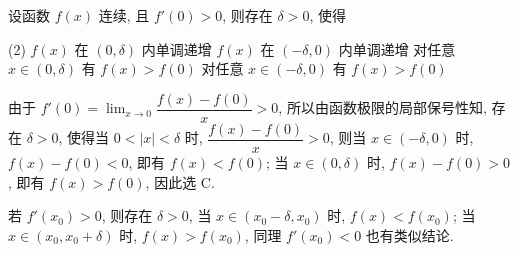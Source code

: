 \begin{example}[2004 数一]
    设函数 $f(x)$ 连续, 且 $f'(0)>0$, 则存在 $\delta>0$, 使得
    \begin{tasks}(2)
        \task $f(x)$ 在 $(0,\delta)$ 内单调递增
        \task $f(x)$ 在 $(-\delta,0)$ 内单调递增
        \task 对任意 $x\in(0,\delta)$ 有 $f(x)>f(0)$
        \task 对任意 $x\in(-\delta,0)$ 有 $f(x)>f(0)$
    \end{tasks}
\end{example}
\begin{solution}
    由于 $f'(0)=\displaystyle\lim_{x\to0}\dfrac{f(x)-f(0)}{x}>0$, 所以由函数极限的局部保号性知, 存在 $\delta>0$, 使得当 $0<|x|<\delta$ 时, $\dfrac{f(x)-f(0)}{x}>0$,
    则当 $x\in(-\delta,0)$ 时, $f(x)-f(0)<0$, 即有 $f(x)<f(0)$; 当 $x\in(0,\delta)$ 时, $f(x)-f(0)>0$, 即有 $f(x)>f(0)$, 因此选 C.
\end{solution}
\begin{inference}
    若 $f'(x_0)>0$, 则存在 $\delta>0$, 当 $x\in(x_0-\delta,x_0)$ 时, $f(x)<f(x_0)$; 当 $x\in(x_0,x_0+\delta)$ 时, $f(x)>f(x_0)$, 同理 $f'(x_0)<0$ 也有类似结论.
\end{inference}

